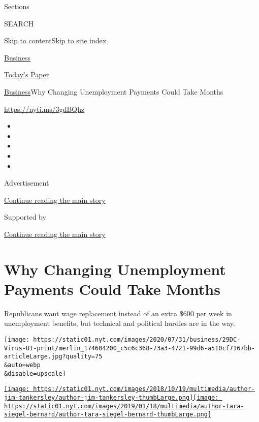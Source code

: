 Sections

SEARCH

\protect\hyperlink{site-content}{Skip to
content}\protect\hyperlink{site-index}{Skip to site index}

\href{https://www.nytimes.com/section/business}{Business}

\href{https://myaccount.nytimes.com/auth/login?response_type=cookie\&client_id=vi}{}

\href{https://www.nytimes.com/section/todayspaper}{Today's Paper}

\href{/section/business}{Business}\textbar{}Why Changing Unemployment
Payments Could Take Months

\url{https://nyti.ms/3gdBQhz}

\begin{itemize}
\item
\item
\item
\item
\item
\end{itemize}

Advertisement

\protect\hyperlink{after-top}{Continue reading the main story}

Supported by

\protect\hyperlink{after-sponsor}{Continue reading the main story}

\hypertarget{why-changing-unemployment-payments-could-take-months}{%
\section{Why Changing Unemployment Payments Could Take
Months}\label{why-changing-unemployment-payments-could-take-months}}

Republicans want wage replacement instead of an extra \$600 per week in
unemployment benefits, but technical and political hurdles are in the
way.

\texttt{[image: https://static01.nyt.com/images/2020/07/31/business/29DC-Virus-UI-print/merlin\_174604200\_c5c6c368-73a3-4721-99d6-a510cf7167bb-articleLarge.jpg?quality=75\\\&auto=webp\\\&disable=upscale]}

\href{https://www.nytimes.com/by/jim-tankersley}{\texttt{[image: https://static01.nyt.com/images/2018/10/19/multimedia/author-jim-tankersley/author-jim-tankersley-thumbLarge.png]}}\href{https://www.nytimes.com/by/tara-siegel-bernard}{\texttt{[image: https://static01.nyt.com/images/2019/01/18/multimedia/author-tara-siegel-bernard/author-tara-siegel-bernard-thumbLarge.png]}}

